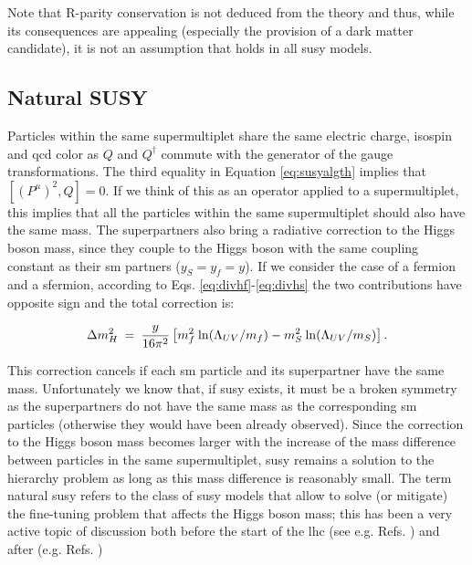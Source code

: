 Note that R-parity conservation is not deduced from the theory and thus, while its consequences are appealing (especially the provision of a dark matter candidate), it is not an assumption that holds in all \gls{susy} models.



\subsection{Natural SUSY}
\label{sec:theo:naturalsusy}

Particles within the same supermultiplet share the same electric charge, isospin and \gls{qcd} color as $Q$ and $Q^\dagger$ commute with the generator of the gauge transformations.
The third equality in Equation \ref{eq:susyalgth} implies that $[ (P^\mu)^2 , Q  ]=0$. If we think of this as an operator applied to a supermultiplet, this implies that all the particles within the same supermultiplet should also have the same mass. The superpartners also bring a radiative correction to the Higgs boson mass, since they couple to the Higgs boson with the same coupling constant as their \gls{sm} partners ($y_S=y_f=y$). If we consider the case of a fermion and a sfermion, according to Eqs. \ref{eq:divhf}-\ref{eq:divhs} the two contributions have opposite sign and the total correction is:

\begin{equation}
\Delta m_H^2 \>=\> {y\over 16 \pi^2}
\left [ m_f^2
\> {\rm ln}(\Lambda_{UV}/m_f) 
- m_S^2
\> {\rm ln}(\Lambda_{UV}/m_S) 
\right ].
\label{eq:divhsusy}
\end{equation}

This correction cancels if each \gls{sm} particle and its superpartner have the same mass. Unfortunately we know that, if \gls{susy} exists, it must be a broken symmetry as the superpartners do not have the same mass as the corresponding \gls{sm} particles (otherwise they would have been already observed). Since the correction to the Higgs boson mass becomes larger with the increase of the mass difference between particles in the same supermultiplet, \gls{susy} remains a solution to the hierarchy problem as long as this mass difference is reasonably small. The term natural \gls{susy} refers to the class of \gls{susy} models that allow to solve (or mitigate) the fine-tuning problem that affects the Higgs boson mass; this has been a very active topic of discussion both before the start of the \gls{lhc} (see e.g. Refs. \cite{BARBIERI198863, Dimopoulos:1995mi}) and after (e.g. Refs. \cite{Papucci:2011wy, Casas:2014eca}) 

